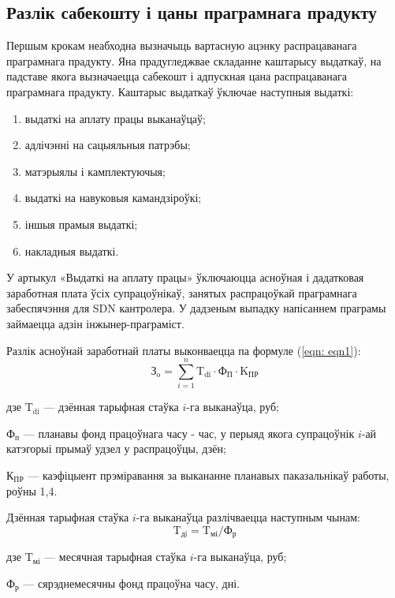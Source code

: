 \subsection{Разлік сабекошту і цаны праграмнага прадукту}

Першым крокам неабходна вызначыць вартасную ацэнку распрацаванага праграмнага прадукту. Яна прадугледжвае складанне каштарысу выдаткаў, на падставе якога вызначаецца сабекошт і адпускная цана распрацаванага праграмнага прадукту.
Каштарыс выдаткаў ўключае наступныя выдаткі:
\begin{enumerate}
    \item выдаткі на аплату працы выканаўцаў;
    \item адлічэнні на сацыяльныя патрэбы;
    \item матэрыялы і камплектуючыя;
    \item выдаткі на навуковыя камандзіроўкі;
    \item іншыя прамыя выдаткі;
    \item накладныя выдаткі.
\end{enumerate}

У артыкул «Выдаткі на аплату працы» ўключаюцца асноўная і дадатковая заработная плата ўсіх супрацоўнікаў, занятых распрацоўкай праграмнага забеспячэння для SDN кантролера. У дадзеным выпадку напісаннем праграмы займаецца адзін інжынер-праграміст.

Разлік асноўнай заработнай платы выконваецца па формуле (\ref{eqn: eqn1}):
\begin{equation}
    \label{eqn: eqn1}
    \text{З}_\text{o} = \sum_{i=1}^{n} \text{T}_\text{di} \cdot \text{Ф}_\text{П} \cdot \text{K}_\text{ПР}
\end{equation}
\begin{Explanation}
    \item[дзе] $\text{T}_\text{di}$ --- дзённая тарыфная стаўка $i$-га выканаўца, руб;
    \item $\text{Ф}_\text{п}$ --- планавы фонд працоўнага часу - час, у перыяд якога
        супрацоўнік $i$-ай катэгорыі прымаў удзел у распрацоўцы, дзён;
    \item $\text{К}_\text{ПР}$ --- каэфіцыент прэміравання за выкананне планавых
        паказальнікаў работы, роўны 1,4.
\end{Explanation}

Дзённая тарыфная стаўка $i$-га выканаўца разлічваецца наступным
чынам:
\begin{equation}
    \text{T}_\text{дi} = \text{T}_\text{мі} / \text{Ф}_\text{р}
\end{equation}
\begin{Explanation}
    \item[дзе] $\text{T}_\text{мі}$ --- месячная тарыфная стаўка $i$-га выканаўца, руб;
    \item $\text{Ф}_\text{р}$ --- сярэднемесячны фонд працоўна часу, дні.
\end{Explanation}

